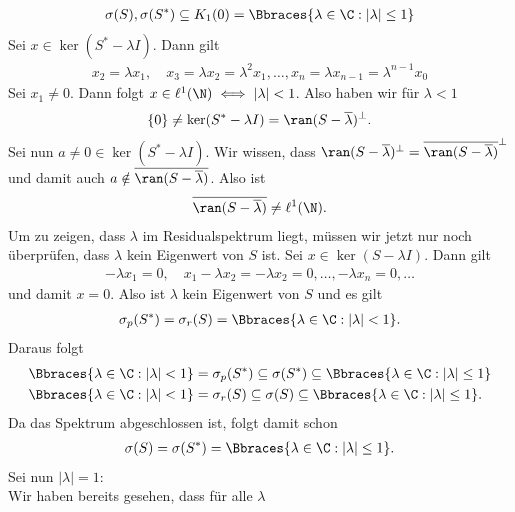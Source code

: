 \begin{solution}
\begin{enumerate}[label = (\alph*)]
  \begin{align*}
    \sigma(S), \sigma(S^*) \subseteq K_{1}(0) = \Bbraces{\lambda \in \C: |\lambda| \leq 1}
  \end{align*}
  Sei $x \in \ker(S^* - \lambda I)$. Dann gilt
  \begin{align*}
    x_2 = \lambda x_1, \quad x_3 = \lambda x_2 = \lambda^2 x_1, \dots, x_n = \lambda x_{n-1} = \lambda^{n-1} x_0
  \end{align*}
  Sei $x_1 \neq 0$. Dann folgt $x \in \ell^1(\N) \iff |\lambda| < 1$.
  Also haben wir für $\lambda < 1$
  \begin{align*}
    \{0\} \neq \ker(S^* - \lambda I) = \ran(S - \overline{\lambda})^{\bot}.
  \end{align*}
  Sei nun $a \neq 0 \in \ker(S^* - \lambda I)$.
  Wir wissen, dass $\ran(S - \overline{\lambda})^{\bot} = \overline{\ran(S - \overline{\lambda})}^{\bot}$
  und damit auch $a \notin \overline{\ran(S - \overline{\lambda})}$. Also ist
  \begin{align*}
     \overline{\ran(S - \overline{\lambda})} \neq \ell^1(\N).
  \end{align*}
  Um zu zeigen, dass $\lambda$ im Residualspektrum liegt, müssen wir jetzt nur noch
  überprüfen, dass $\lambda$ kein Eigenwert von $S$ ist.
  Sei $x \in \ker(S - \lambda I)$. Dann gilt
  \begin{align*}
    -\lambda x_1 = 0, \quad x_1 - \lambda x_2 = -\lambda x_2 = 0, \dots, -\lambda x_n = 0, \dots
  \end{align*}
  und damit $x = 0$. Also ist $\lambda$ kein Eigenwert von $S$ und es gilt
  \begin{align*}
    \sigma_p(S^\ast) = \sigma_r(S) = \Bbraces{\lambda \in \C: |\lambda| < 1}.
  \end{align*}
  Daraus folgt
  \begin{align*}
    \Bbraces{\lambda \in \C: |\lambda| < 1} &= \sigma_p(S^\ast) \subseteq \sigma(S^*) \subseteq \Bbraces{\lambda \in \C: |\lambda| \leq 1} \\
    \Bbraces{\lambda \in \C: |\lambda| < 1} &= \sigma_r(S) \subseteq \sigma(S) \subseteq \Bbraces{\lambda \in \C: |\lambda| \leq 1}.
  \end{align*}
  Da das Spektrum abgeschlossen ist, folgt damit schon
  \begin{align*}
    \sigma(S) = \sigma(S^*) = \Bbraces{\lambda \in \C: |\lambda| \leq 1}.
  \end{align*}
  Sei nun $|\lambda| = 1$: \\
  Wir haben bereits gesehen, dass für alle $\lambda$

\end{enumerate}
\end{solution}

